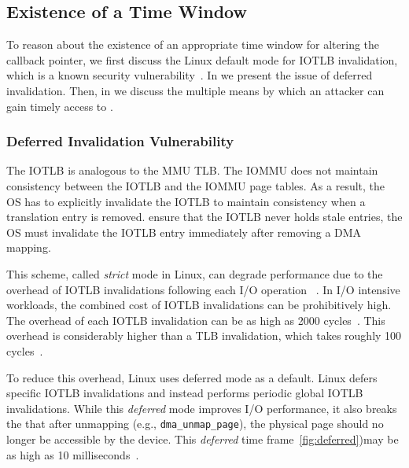 \subsection{Existence of a Time Window}\label{sec:timely}
To reason about the existence of an appropriate time window for altering the callback pointer, we first discuss the Linux default mode for IOTLB invalidation, which is a known security vulnerability~\cite{MMT16,MSMT18}.
In \DIFdelbegin {}\DIFdelend \DIFaddbegin {}\DIFaddend we present the issue of deferred invalidation. Then, in \DIFdelbegin {}\DIFdelend \DIFaddbegin {}\DIFaddend we discuss the multiple means by which an attacker can gain timely access to \shinfo.

\subsubsection{Deferred Invalidation Vulnerability}\label{sec:deferred}
The IOTLB is analogous to the MMU TLB. The IOMMU does not maintain consistency between the IOTLB and the IOMMU page tables. As a result, the OS has to explicitly invalidate the IOTLB to maintain consistency when a translation entry is removed. \DIFdelbegin {}\DIFdelend \DIFaddbegin {}\DIFaddend ensure that the IOTLB never holds stale entries, the OS must invalidate the IOTLB entry immediately after removing a DMA mapping. 

This scheme, called \emph{strict} mode in Linux, can degrade performance due to the overhead of IOTLB invalidations following each I/O operation ~\cite{MMT16,MSMT18,Peleg15}. In I/O intensive workloads, the combined cost of IOTLB invalidations can be prohibitively high. The overhead of each IOTLB invalidation can be as high as 2000 cycles~\cite{ABYTS11}. This overhead is considerably higher than a TLB invalidation, which takes roughly 100 cycles~\cite{Han14}. 

To reduce this overhead, Linux uses deferred mode as a default. Linux defers specific IOTLB invalidations and instead performs periodic global IOTLB invalidations. While this \emph{deferred} mode improves I/O performance, it also breaks the \DIFdelbegin {}\DIFdelend \DIFaddbegin {}\DIFaddend that after unmapping (e.g., \texttt{dma\_unmap\_page}), the physical page should no longer be accessible by the device. This \emph{deferred} time frame\DIFdelbegin {}\DIFdelend \DIFaddbegin {}\DIFaddend ~\ref{fig:deferred})\DIFaddbegin \DIFadd{, }\DIFaddend may be as high as 10 milliseconds~\cite{MSMT18}.

